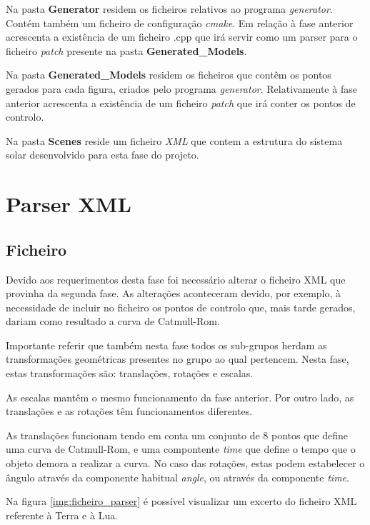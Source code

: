 \documentclass[a4paper]{article}
\begin{document}
Na pasta \textbf{Generator} residem os ficheiros relativos ao programa \emph{generator}. Contém também um ficheiro de configuração \emph{cmake}. Em relação à fase anterior acrescenta a existência de um ficheiro .cpp que irá servir como um parser para o ficheiro \textit{patch} presente na pasta \textbf{Generated\_Models}.

Na pasta \textbf{Generated\_Models} residem os ficheiros que contêm os pontos gerados para cada figura, criados pelo programa \emph{generator}. Relativamente à fase anterior acrescenta a existência de um ficheiro \textit{patch} que irá conter os pontos de controlo.

Na pasta \textbf{Scenes} reside um ficheiro \emph{XML} que contem a estrutura do sistema solar desenvolvido para esta fase do projeto.

\newpage

\section{Parser XML}
\label{sec:parser}

\subsection{Ficheiro}
\label{sec:ficheiro}

Devido aos requerimentos desta fase foi necessário alterar o ficheiro XML que provinha da segunda fase. As alterações aconteceram devido, por exemplo, à necessidade de incluir no ficheiro os pontos de controlo que, mais tarde gerados, dariam como resultado a curva de Catmull-Rom.

Importante referir que também nesta fase todos os sub-grupos herdam as transformações geométricas presentes no grupo ao qual pertencem. Nesta fase, estas transformações são: translações, rotações e escalas.

As escalas mantêm o mesmo funcionamento da fase anterior. Por outro lado, as translações e as rotações têm funcionamentos diferentes.

As translações funcionam tendo em conta um conjunto de 8 pontos que define uma curva de Catmull-Rom, e uma compontente \textit{time} que define o tempo que o objeto demora a realizar a curva. No caso das rotações, estas podem estabelecer o ângulo através da componente habitual \textit{angle}, ou através da componente \textit{time}.

Na figura \ref{img:ficheiro_parser} é possível visualizar um excerto do ficheiro XML referente à Terra e à Lua.
\end{document}
